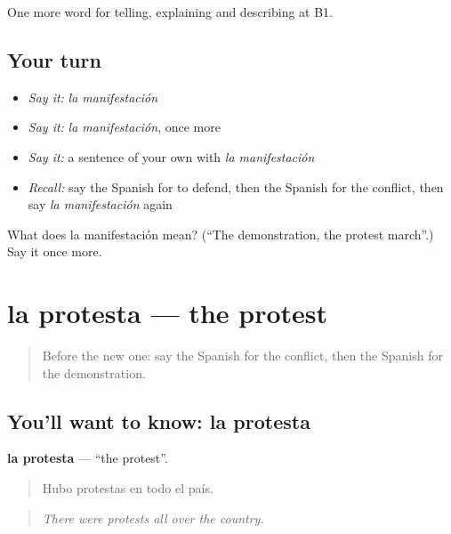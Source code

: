 \begin{grammarlens}[title={What you've built}]
One more word for telling, explaining and describing at B1.
\end{grammarlens}

\subsection*{Your turn}
\begin{itemize}
\raggedright
  \item \emph{Say it:} \emph{la manifestación}
  \item \emph{Say it:} \emph{la manifestación}, once more
  \item \emph{Say it:} a sentence of your own with \emph{la manifestación}
  \item \emph{Recall:} say the Spanish for to defend, then the Spanish for the conflict, then say \emph{la manifestación} again
\end{itemize}

\begin{tcolorbox}[breakable,colback=teal!4,colframe=teal!35!black,title={Before you move on}]
What does la manifestación mean? (\textquotedblleft{}The demonstration, the protest march\textquotedblright{}.) Say it once more.
\end{tcolorbox}
\section[la protesta]{la protesta — the protest}

\label{lesson:ES-C570-protesta}



\begin{quote}
Before the new one: say the Spanish for the conflict, then the Spanish for the demonstration.
\end{quote}

\subsection*{You'll want to know: la protesta}
\textbf{la protesta} — \textquotedblleft{}the protest\textquotedblright{}.

\begin{quote}
Hubo protestas en todo el país.
\end{quote}

\begin{quote}
\emph{There were protests all over the country.}
\end{quote}

